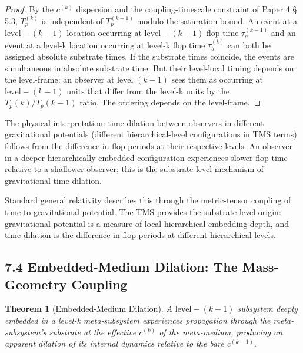 \documentclass[11pt,oneside]{report}
\newtheorem{theorem}{Theorem}[section]
\theoremstyle{definition}
\theoremstyle{remark}
\begin{document}
\begin{proof}
By the \ensuremath{c^{(k)}} dispersion and the coupling-timescale
constraint of Paper 4 \S\,5.3, \ensuremath{T_{p}^{(k)}} is independent of \ensuremath{T_{p}^{(k-1)}}
modulo the saturation bound. An event at a \ensuremath{\text{level}-(k-1)} location
occurring at \ensuremath{\text{level}-(k-1)} flop time \ensuremath{\tau_{a}^{(k-1)}} and an event at a
level-k location occurring at level-k flop time \ensuremath{\tau_{b}^{(k)}} can both be
assigned absolute substrate times. If the substrate times coincide, the
events are simultaneous in absolute substrate time. But their
level-local timing depends on the level-frame: an observer at level
\ensuremath{(k-1)} sees them as occurring at \ensuremath{\text{level}-(k-1)} units that differ from the
level-k units by the \ensuremath{T_{p}(k)/T_{p}(k-1)} ratio. The ordering depends on
the level-frame.

\end{proof}

The physical interpretation: time dilation between observers in
different gravitational potentials (different hierarchical-level
configurations in TMS terms) follows from the difference in flop periods
at their respective levels. An observer in a deeper
hierarchically-embedded configuration experiences slower flop time
relative to a shallower observer; this is the substrate-level mechanism
of gravitational time dilation.

Standard general relativity describes this through the metric-tensor
coupling of time to gravitational potential. The TMS provides the
substrate-level origin: gravitational potential is a measure of local
hierarchical embedding depth, and time dilation is the difference in
flop periods at different hierarchical levels.

\subsection*{7.4 Embedded-Medium Dilation: The Mass-Geometry Coupling}

\begin{theorem}[Embedded-Medium Dilation]
A \ensuremath{\text{level}-(k-1)} subsystem
deeply embedded in a level-k meta-subsystem experiences propagation
through the meta-subsystem's substrate at the effective \ensuremath{c^{(k)}} of the
meta-medium, producing an apparent dilation of its internal dynamics
relative to the bare \ensuremath{c^{(k-1)}.}
\end{theorem}
\end{document}
